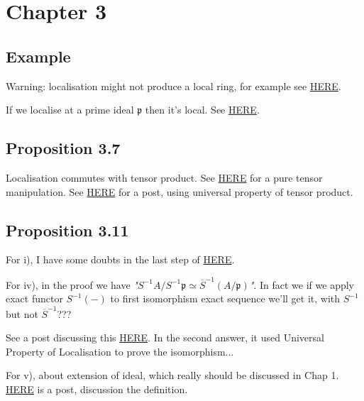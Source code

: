 \section{Chapter 3}

\subsection{Example}

Warning: localisation might not produce a local ring, for example see \href{https://math.stackexchange.com/questions/628371/a-f-is-not-a-local-ring}{HERE}.

If we localise at a prime ideal $\mathfrak p$ then it's local. See \href{https://math.stackexchange.com/questions/300446/why-is-the-localization-at-a-prime-ideal-a-local-ring#:~:text=Well%2C%20any%20proper%20ideal%20m,p%20is%20a%20local%20ring.}{HERE}.

\subsection{Proposition 3.7}

Localisation commutes with tensor product. See \href{http://sporadic.stanford.edu/math210a/sol4.pdf}{HERE} for a pure tensor manipulation. See \href{https://math.stackexchange.com/questions/2292960/localization-commutes-with-tensor-products}{HERE} for a post, using universal property of tensor product.

\subsection{Proposition 3.11}

For i), I have some doubts in the last step of \href{https://math.stackexchange.com/questions/375353/every-ideal-of-the-localization-is-an-extended-ideal}{HERE}.

For iv), in the proof we have \textit{"$S^{-1}A/S^{-1}\mathfrak p\simeq \overline{S}^{-1}(A/\mathfrak p)$"}. In fact we if we apply exact functor $S^{-1}(-)$ to first isomorphism exact sequence we'll get it, with $S^{-1}$ but not $\overline{S}^{-1}$???

See a post discussing this \href{https://math.stackexchange.com/questions/1630232/localization-commutes-with-quotient}{HERE}. In the second answer, it used Universal Property of Localisation to prove the isomorphism...

For v), about extension of ideal, which really should be discussed in Chap 1.
\href{https://math.stackexchange.com/questions/367073/about-the-definition-of-extended-ideals}{HERE} is a post, discussion the definition.

